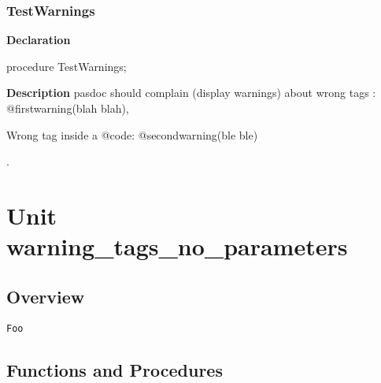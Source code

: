 \documentclass{report}
\begin{document}
\subsection*{TestWarnings}
\begin{list}{}{
\setlength{\itemindent}{0cm}
\setlength{\listparindent}{0cm}
\setlength{\leftmargin}{\evensidemargin}
\addtolength{\leftmargin}{\tmplength}
\settowidth{\labelsep}{X}
\addtolength{\leftmargin}{\labelsep}
\setlength{\labelwidth}{\tmplength}
}
\begin{flushleft}
\item[\textbf{Declaration}\hfill]
\begin{ttfamily}
procedure TestWarnings;\end{ttfamily}


\end{flushleft}
\par
\item[\textbf{Description}]
pasdoc should complain (display warnings) about wrong tags : @firstwarning(blah blah), \begin{ttfamily}Wrong tag inside a @code: @secondwarning(ble ble)\end{ttfamily}.

\end{list}
\chapter{Unit warning{\_}tags{\_}no{\_}parameters}
\section{Overview}
\begin{description}
\item[\texttt{Foo}]
\end{description}
\section{Functions and Procedures}
\end{document}
